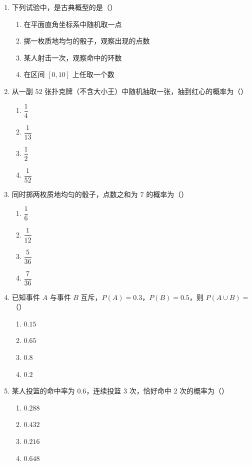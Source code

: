 \documentclass[12pt, a4paper]{ctexart}
\begin{document}
\begin{enumerate}
\item 下列试验中，是古典概型的是（\quad）
  \begin{enumerate}[label=\Alph*., itemsep=0pt]
    \item 在平面直角坐标系中随机取一点
    \item 掷一枚质地均匀的骰子，观察出现的点数
    \item 某人射击一次，观察命中的环数
    \item 在区间 $[0,10]$ 上任取一个数
  \end{enumerate}

\item 从一副 $52$ 张扑克牌（不含大小王）中随机抽取一张，抽到红心的概率为（\quad）
  \begin{enumerate}[label=\Alph*., itemsep=0pt]
    \item $\dfrac{1}{4}$ \quad \item $\dfrac{1}{13}$ \quad \item $\dfrac{1}{2}$ \quad \item $\dfrac{1}{52}$
  \end{enumerate}

\item 同时掷两枚质地均匀的骰子，点数之和为 $7$ 的概率为（\quad）
  \begin{enumerate}[label=\Alph*., itemsep=0pt]
    \item $\dfrac{1}{6}$ \quad \item $\dfrac{1}{12}$ \quad \item $\dfrac{5}{36}$ \quad \item $\dfrac{7}{36}$
  \end{enumerate}

\item 已知事件 $A$ 与事件 $B$ 互斥，$P(A)=0.3$，$P(B)=0.5$，则 $P(A\cup B)=$（\quad）
  \begin{enumerate}[label=\Alph*., itemsep=0pt]
    \item $0.15$ \quad \item $0.65$ \quad \item $0.8$ \quad \item $0.2$
  \end{enumerate}

\item 某人投篮的命中率为 $0.6$，连续投篮 $3$ 次，恰好命中 $2$ 次的概率为（\quad）
  \begin{enumerate}[label=\Alph*., itemsep=0pt]
    \item $0.288$ \quad \item $0.432$ \quad \item $0.216$ \quad \item $0.648$
  \end{enumerate}


\end{enumerate}
\end{document}
